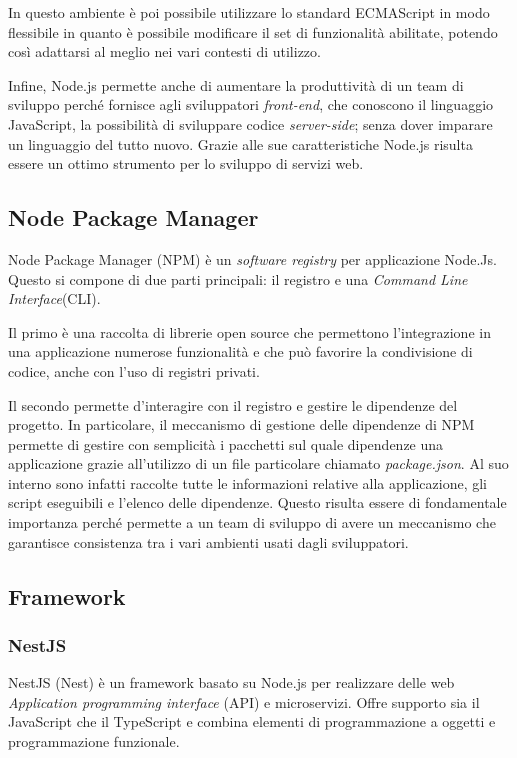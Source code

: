 In questo ambiente è poi possibile utilizzare lo standard ECMAScript in modo flessibile in quanto è possibile modificare il set di funzionalità abilitate,
potendo così adattarsi al meglio nei vari contesti di utilizzo.

Infine, Node.js permette anche di aumentare la produttività di un team di sviluppo perché fornisce agli sviluppatori \textit{front-end},
che conoscono il linguaggio JavaScript, la possibilità di sviluppare codice \textit{server-side}; senza dover imparare un linguaggio del tutto nuovo.
Grazie alle sue caratteristiche Node.js risulta essere un ottimo strumento per lo sviluppo di servizi web.

\subsection{Node Package Manager}
Node Package Manager\cite{NPM} (NPM) è un \textit{software registry} per applicazione Node.Js.
Questo si compone di due parti principali: il registro e una \textit{Command Line Interface}(CLI).

Il primo è una raccolta di librerie open source che permettono l'integrazione in una applicazione
numerose funzionalità e che può favorire la condivisione di codice, anche con l'uso di registri privati.

Il secondo permette d'interagire con il registro e gestire le dipendenze del progetto.
In particolare, il meccanismo di gestione delle dipendenze di NPM permette di gestire con
semplicità i pacchetti sul quale dipendenze una applicazione
grazie all'utilizzo di un file particolare chiamato \textit{package.json}. Al suo interno
sono infatti raccolte tutte le informazioni relative
alla applicazione, gli script eseguibili e l'elenco delle dipendenze.
Questo risulta essere di fondamentale importanza perché permette a un team di sviluppo di
avere un meccanismo che garantisce consistenza tra i vari ambienti usati dagli sviluppatori.


\subsection{Framework}
\subsubsection{NestJS}
NestJS \cite{NestJS} (Nest) è un framework basato su Node.js per realizzare delle web \textit{Application programming interface} (API) e microservizi.
Offre supporto sia il JavaScript che il TypeScript e combina elementi di programmazione a oggetti e programmazione funzionale.


